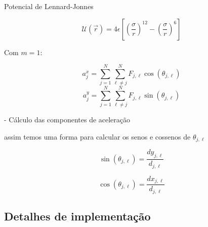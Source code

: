 Potencial de Lennard-Jonnes

\begin{equation}
    \mathcal{U}(\vec{r}) = 4 \epsilon \left[ \left(\frac{\sigma}{r} \right)^12 - \left(\frac{\sigma}{r}\right)^6 \right]
\end{equation}


Com $ m = 1 $: 

$$
    a^{x}_{j} = \sum_{j = 1}^{N} \sum_{\ell \neq j}^{N} F_{j, \ell} \cos(\theta_{j, \ell})
$$
$$
    a^{y}_{j} = \sum_{j = 1}^{N} \sum_{\ell \neq j}^{N} F_{j, \ell} \sin(\theta_{j, \ell})
$$



- Cálculo das componentes de aceleração 


assim temos uma forma para calcular os senos e cossenos de $\theta_{j, \ell}$ 


$$ \sin(\theta_{j, \ell}) = \frac{dy_{j, \ell}}{d_{j, \ell}} $$

$$ \cos(\theta_{j, \ell}) = \frac{dx_{j, \ell}}{d_{j, \ell}} $$


\subsection{Detalhes de implementação}




